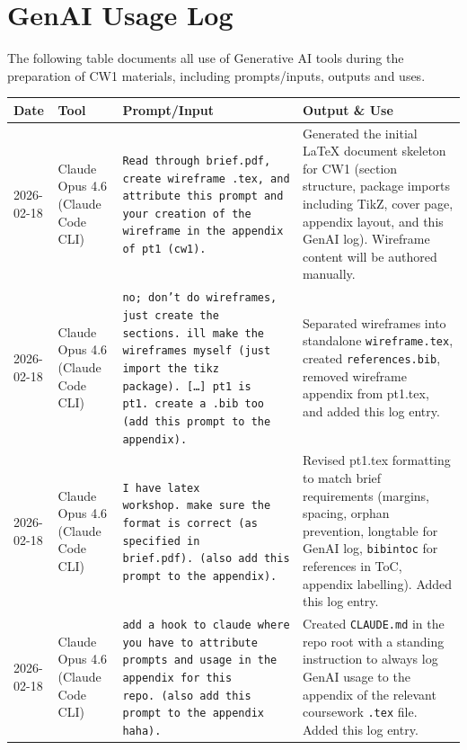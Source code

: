 \documentclass[a4paper,11pt]{article}
\begin{document}
\newpage
\appendix

\section{GenAI Usage Log}\label{app:genai}

The following table documents all use of Generative AI tools during the
preparation of CW1 materials, including prompts/inputs, outputs and uses.

\vspace{0.5em}
\noindent
\begin{longtable}{@{}p{1.8cm}p{2.8cm}p{4.5cm}p{4.5cm}@{}}
\toprule
\textbf{Date} & \textbf{Tool} & \textbf{Prompt/Input} & \textbf{Output \& Use} \\
\midrule
\endhead
2026-02-18
& Claude Opus 4.6 (Claude Code CLI)
& \texttt{Read through brief.pdf, create wireframe .tex, and attribute this
  prompt and your creation of the wireframe in the appendix of pt1 (cw1).}
& Generated the initial \LaTeX{} document skeleton for CW1 (section structure,
  package imports including TikZ, cover page, appendix layout, and this GenAI
  log).  Wireframe content will be authored manually. \\
\midrule
2026-02-18
& Claude Opus 4.6 (Claude Code CLI)
& \texttt{no; don't do wireframes, just create the sections.\ ill make the
  wireframes myself (just import the tikz package).\ [\ldots] pt1 is pt1.\
  create a .bib too (add this prompt to the appendix).}
& Separated wireframes into standalone \texttt{wireframe.tex}, created
  \texttt{references.bib}, removed wireframe appendix from pt1.tex, and added
  this log entry. \\
\midrule
2026-02-18
& Claude Opus 4.6 (Claude Code CLI)
& \texttt{I have latex workshop.\ make sure the format is correct (as specified
  in brief.pdf).\ (also add this prompt to the appendix).}
& Revised pt1.tex formatting to match brief requirements (margins, spacing,
  orphan prevention, longtable for GenAI log, \texttt{bibintoc} for references
  in ToC, appendix labelling).  Added this log entry. \\
\midrule
2026-02-18
& Claude Opus 4.6 (Claude Code CLI)
& \texttt{add a hook to claude where you have to attribute prompts and usage in
  the appendix for this repo.\ (also add this prompt to the appendix haha).}
& Created \texttt{CLAUDE.md} in the repo root with a standing instruction to
  always log GenAI usage to the appendix of the relevant coursework \texttt{.tex}
  file.  Added this log entry. \\
\bottomrule
\end{longtable}
\end{document}
